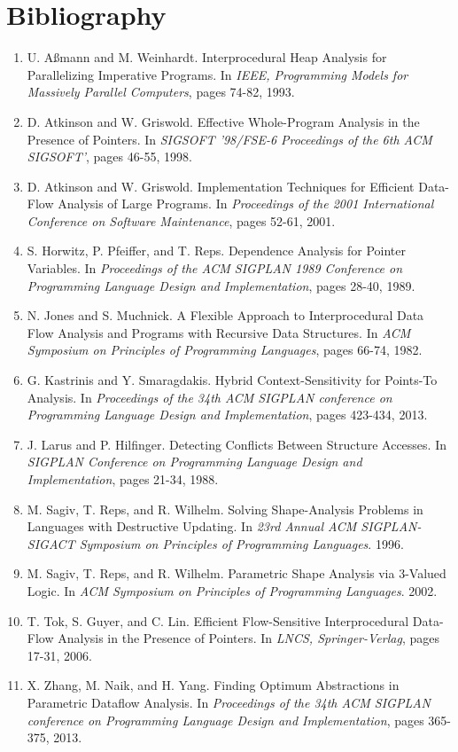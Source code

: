 \documentclass{article}
\begin{document}
\section{Bibliography}

\begin{enumerate}[1.]
    \item U. A{\ss}mann and M. Weinhardt. Interprocedural Heap Analysis for
        Parallelizing Imperative Programs. In \textit{IEEE, Programming
        Models for Massively Parallel Computers}, pages 74-82, 1993.
    \item D. Atkinson and W. Griswold. Effective Whole-Program Analysis in
        the Presence of Pointers. In \textit{SIGSOFT '98/FSE-6 Proceedings
        of the 6th ACM SIGSOFT'}, pages 46-55, 1998.
    \item D. Atkinson and W. Griswold. Implementation Techniques for
        Efficient Data-Flow Analysis of Large Programs. In
        \textit{Proceedings of the 2001 International Conference on Software
        Maintenance}, pages 52-61, 2001.
    \item S. Horwitz, P. Pfeiffer, and T. Reps. Dependence Analysis for
        Pointer Variables. In \textit{Proceedings of the ACM SIGPLAN 1989
        Conference on Programming Language Design and Implementation}, pages
        28-40, 1989.
    \item N. Jones and S. Muchnick. A Flexible Approach to Interprocedural
        Data Flow Analysis and Programs with Recursive Data Structures. In
        \textit{ACM Symposium on Principles of Programming Languages}, pages
        66-74, 1982.
    \item G. Kastrinis and Y. Smaragdakis. Hybrid Context-Sensitivity for
        Points-To Analysis. In \textit{Proceedings of the 34th ACM SIGPLAN
        conference on Programming Language Design and Implementation}, pages
        423-434, 2013.
    \item J. Larus and P. Hilfinger. Detecting Conflicts Between Structure
        Accesses. In \textit{SIGPLAN Conference on Programming Language
        Design and Implementation}, pages 21-34, 1988.
    \item M. Sagiv, T. Reps, and R. Wilhelm. Solving Shape-Analysis Problems
        in Languages with Destructive Updating. In \textit{23rd Annual ACM
        SIGPLAN-SIGACT Symposium on Principles of Programming Languages}.
        1996.
    \item M. Sagiv, T. Reps, and R. Wilhelm. Parametric Shape Analysis via
        3-Valued Logic. In \textit{ACM Symposium on Principles of
        Programming Languages}. 2002.
    \item T. Tok, S. Guyer, and C. Lin. Efficient Flow-Sensitive
        Interprocedural Data-Flow Analysis in the Presence of Pointers. In
        \textit{LNCS, Springer-Verlag}, pages 17-31, 2006.
    \item X. Zhang, M. Naik, and H. Yang. Finding Optimum Abstractions in
        Parametric Dataflow Analysis. In \textit{Proceedings of the 34th ACM
        SIGPLAN conference on Programming Language Design and
        Implementation}, pages 365-375, 2013.
\end{enumerate}
\end{document}
